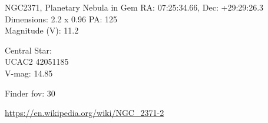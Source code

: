 \begin{block}{NGC2371, Planetary Nebula in Gem}
    RA: 07:25:34.66, Dec: +29:29:26.3 \\ 
    Dimensions: 2.2 x 0.96 PA: 125 \\ 
    Magnitude (V): 11.2

    Central Star: \\ 
      \hspace{1em}UCAC2 42051185 \\ 
      \hspace{1em}V-mag: 14.85 


    Finder fov: 30 

    \url{https://en.wikipedia.org/wiki/NGC_2371-2} 
\end{block}